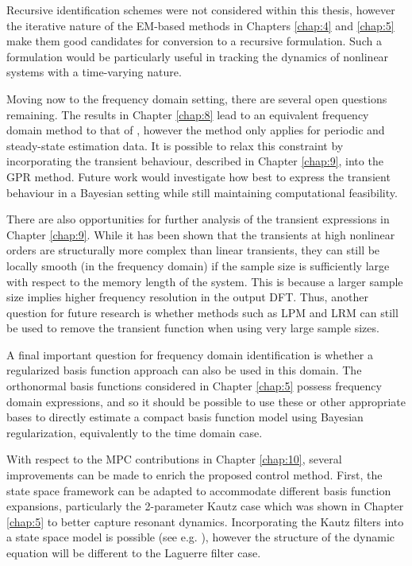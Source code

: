 Recursive identification schemes were not considered within this thesis, however the iterative nature of the EM-based methods in Chapters \ref{chap:4} and \ref{chap:5} make them good candidates for conversion to a recursive formulation. Such a formulation would be particularly useful in tracking the dynamics of nonlinear systems with a time-varying nature.

Moving now to the frequency domain setting, there are several open questions remaining. The results in Chapter \ref{chap:8} lead to an equivalent frequency domain method to that of \cite{Birpoutsoukis2017}, however the method only applies for periodic and steady-state estimation data. It is possible to relax this constraint by incorporating the transient behaviour, described in Chapter \ref{chap:9}, into the GPR method. Future work would investigate how best to express the transient behaviour in a Bayesian setting while still maintaining computational feasibility. 

There are also opportunities for further analysis of the transient expressions in Chapter \ref{chap:9}. While it has been shown that the transients at high nonlinear orders are structurally more complex than linear transients, they can still be locally smooth (in the frequency domain) if the sample size is sufficiently large with respect to the memory length of the system. This is because a larger sample size implies higher frequency resolution in the output DFT. Thus, another question for future research is whether methods such as LPM and LRM can still be used to remove the transient function when using very large sample sizes.

A final important question for frequency domain identification is whether a regularized basis function approach can also be used in this domain. The orthonormal basis functions considered in Chapter \ref{chap:5} possess frequency domain expressions, and so it should be possible to use these or other appropriate bases to directly estimate a compact basis function model using Bayesian regularization, equivalently to the time domain case.

With respect to the MPC contributions in Chapter \ref{chap:10}, several improvements can be made to enrich the proposed control method. First, the state space framework can be adapted to accommodate different basis function expansions, particularly the 2-parameter Kautz case which was shown in Chapter \ref{chap:5} to better capture resonant dynamics. Incorporating the Kautz filters into a state space model is possible (see e.g. \cite{Mbarek2003}), however the structure of the dynamic equation will be different to the Laguerre filter case. 

